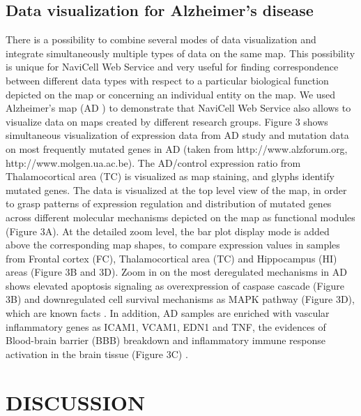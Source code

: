 \documentclass[a4,center,fleqn]{NAR}
\begin{document}
\subsection{Data visualization for Alzheimer’s disease}

There is a possibility to combine several modes of data visualization and
integrate simultaneously multiple types of data on the same map. This
possibility is unique for NaviCell Web Service and very useful for finding
correspondence between different data types with respect to a particular
biological function depicted on the map or concerning an individual entity on
the map. We used Alzheimer’s map (AD \cite{Mizuno2012}) to demonstrate that
NaviCell Web Service also allows to visualize data on maps created by different
research groups. Figure 3 shows simultaneous visualization of expression data
from AD study \cite{hokama2013altered}  and mutation data on most frequently
mutated genes in AD (taken from http://www.alzforum.org,
http://www.molgen.ua.ac.be). The AD/control expression ratio from
Thalamocortical area (TC) is visualized as map staining, and glyphs identify
mutated genes. The data is visualized at the top level view of the map, in
order to grasp patterns of expression regulation and distribution of mutated
genes across different molecular mechanisms depicted on the map as functional
modules (Figure 3A). At the detailed zoom level, the bar plot display mode is
added above the corresponding map shapes, to compare expression values in
samples from Frontal cortex (FC), Thalamocortical area (TC) and Hippocampus
(HI) areas (Figure 3B and 3D).  Zoom in on the most deregulated mechanisms in
AD shows elevated apoptosis signaling as overexpression of caspase cascade
(Figure 3B) and downregulated cell survival mechanisms as MAPK pathway (Figure
3D), which are known facts \cite{lukiw2010inflammatory}. In addition, AD
samples are enriched with vascular inflammatory genes as ICAM1, VCAM1, EDN1 and
TNF, the evidences of Blood-brain barrier (BBB) breakdown and inflammatory
immune response activation in the brain tissue (Figure 3C)
\cite{erickson2013blood}.

\section{DISCUSSION}
\end{document}
